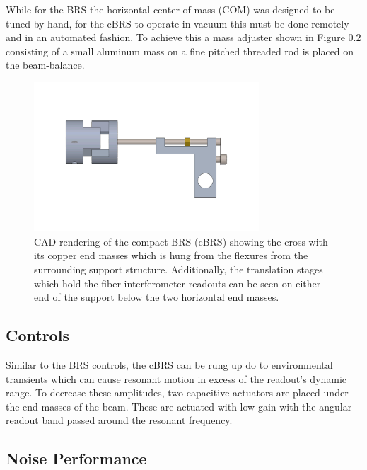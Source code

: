 \documentclass [12pt, proquest]{uwthesis}[2019]
\begin{document}
While for the BRS the horizontal center of mass (COM) was designed to be tuned by hand, for the cBRS to operate in vacuum this must be done remotely and in an automated fashion. To achieve this a mass adjuster shown in Figure \ref{} consisting of a small aluminum mass on a fine pitched threaded rod is placed on the beam-balance.

\begin{figure}[!h]
\begin{center}
\includegraphics[width=0.75\textwidth]{cBRSMassAdjuster.png}
\end{center}
\caption{CAD rendering of the compact BRS (cBRS) showing the cross with its copper end masses which is hung from the flexures from the surrounding support structure. Additionally, the translation stages which hold the fiber interferometer readouts can be seen on either end of the support below the two horizontal end masses.}
\end{figure}

\subsection{Controls}

Similar to the BRS controls, the cBRS can be rung up do to environmental transients which can cause resonant motion in excess of the readout's dynamic range. To decrease these amplitudes, two capacitive actuators are placed under the end masses of the beam. These are actuated with low gain with the angular readout band passed around the resonant frequency. 

\subsection{Noise Performance}
\end{document}
